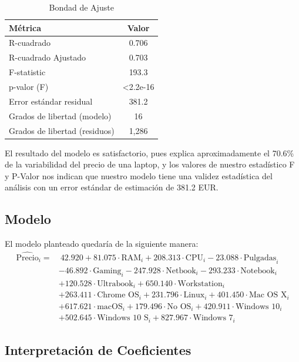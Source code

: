 \documentclass[12pt,a4paper]{article}
\begin{document}
\begin{table}[H]
\centering
\caption{Bondad de Ajuste}
\begin{tabular}{lc}
\toprule
\textbf{Métrica} & \textbf{Valor} \\
\midrule
R-cuadrado & 0.706 \\
R-cuadrado Ajustado & 0.703 \\
F-statistic & 193.3 \\
p-valor (F) & \textless{}2.2e-16 \\
Error estándar residual & 381.2 \\
Grados de libertad (modelo) & 16 \\
Grados de libertad (residuos) & 1,286 \\
\bottomrule
\end{tabular}
\end{table}

El resultado del modelo es satisfactorio, pues explica aproximadamente el 70.6\% de la variabilidad del precio de una laptop, y los valores de nuestro estadístico F y P-Valor nos indican que nuestro modelo tiene una validez estadística del análisis con un error estándar de estimación de 381.2 EUR.

\subsection{Modelo}
El modelo planteado quedaría de la siguiente manera:
\begin{equation}
\begin{aligned}
\widehat{\text{Precio}}_i = & \ 42.920 + 81.075 \cdot \text{RAM}_i + 208.313 \cdot \text{CPU}_i - 23.088 \cdot \text{Pulgadas}_i \\
& - 46.892 \cdot \text{Gaming}_i - 247.928 \cdot \text{Netbook}_i - 293.233 \cdot \text{Notebook}_i \\
& + 120.528 \cdot \text{Ultrabook}_i + 650.140 \cdot \text{Workstation}_i \\
& + 263.411 \cdot \text{Chrome OS}_i + 231.796 \cdot \text{Linux}_i + 401.450 \cdot \text{Mac OS X}_i \\
& + 617.621 \cdot \text{macOS}_i + 179.496 \cdot \text{No OS}_i + 420.911 \cdot \text{Windows 10}_i \\
& + 502.645 \cdot \text{Windows 10 S}_i + 827.967 \cdot \text{Windows 7}_i
\end{aligned}
\end{equation}


\subsection{Interpretación de Coeficientes}
\end{document}
